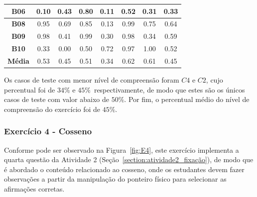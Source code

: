 \begin{table}[htbp]
\begin{tabular}{|c|cccccc|c|}
		\textbf{B06} & \multicolumn{1}{c|}{0.10} & \multicolumn{1}{c|}{0.43} & \multicolumn{1}{c|}{0.80} & \multicolumn{1}{c|}{0.11} & \multicolumn{1}{c|}{0.52} & 0.31 & 0.33 \\ \hline
		\rowcolor[HTML]{D9D9D9} 
		\textbf{B08} & \multicolumn{1}{c|}{\cellcolor[HTML]{D9D9D9}0.95} & \multicolumn{1}{c|}{\cellcolor[HTML]{D9D9D9}0.69} & \multicolumn{1}{c|}{\cellcolor[HTML]{D9D9D9}0.85} & \multicolumn{1}{c|}{\cellcolor[HTML]{D9D9D9}0.13} & \multicolumn{1}{c|}{\cellcolor[HTML]{D9D9D9}0.99} & 0.75 & 0.64 \\ \hline
		\textbf{B09} & \multicolumn{1}{c|}{0.98} & \multicolumn{1}{c|}{0.41} & \multicolumn{1}{c|}{0.99} & \multicolumn{1}{c|}{0.30} & \multicolumn{1}{c|}{0.98} & 0.34 & 0.59 \\ \hline
		\rowcolor[HTML]{D9D9D9} 
		\textbf{B10} & \multicolumn{1}{c|}{\cellcolor[HTML]{D9D9D9}0.33} & \multicolumn{1}{c|}{\cellcolor[HTML]{D9D9D9}0.00} & \multicolumn{1}{c|}{\cellcolor[HTML]{D9D9D9}0.50} & \multicolumn{1}{c|}{\cellcolor[HTML]{D9D9D9}0.72} & \multicolumn{1}{c|}{\cellcolor[HTML]{D9D9D9}0.97} & 1.00 & 0.52 \\ \hline
		\textbf{Média} & \multicolumn{1}{c|}{0.53} & \multicolumn{1}{c|}{0.45} & \multicolumn{1}{c|}{0.51} & \multicolumn{1}{c|}{0.34} & \multicolumn{1}{c|}{0.62} & 0.61 & 0.45 \\ \hline
	\end{tabular}
	\label{tab:F3_A3_NCQ}
\end{table}

Os casos de teste com menor nível de compreensão foram $C4$ e $C2$, cujo percentual foi de $34\%$ e $45\%$\ respectivamente, de modo que estes são os únicos casos de teste com valor abaixo de $50\%$. Por fim, o percentual médio do nível de compreensão do exercício foi de $45\%$.


\subsubsection{Exercício 4 - Cosseno}\label{subsubsec:F3A4}

Conforme pode ser observado na Figura~\ref{fig:E4}, este exercício implementa a quarta questão da Atividade 2 (Seção~\ref{section:atividade2_fixação}), de modo que é abordado o conteúdo relacionado ao cosseno, onde os estudantes devem fazer observações a partir da manipulação do ponteiro físico para selecionar as afirmações corretas. 


